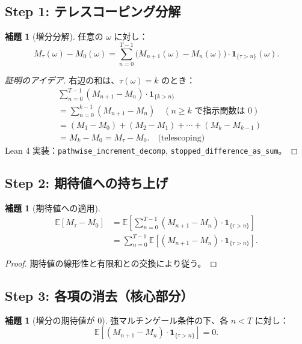 \documentclass[a4paper,12pt]{ltjsarticle}
\theoremstyle{definition}
\newtheorem{lemma}[definition]{補題}
\begin{document}
\subsection{Step 1: テレスコーピング分解}

\begin{lemma}[増分分解]
任意の $\omega$ に対し：
\[
  M_\tau(\omega) - M_0(\omega) =
  \sum_{n=0}^{T-1} \bigl(M_{n+1}(\omega) - M_n(\omega)\bigr) \cdot \mathbf{1}_{\{\tau > n\}}(\omega).
\]
\end{lemma}

\begin{proof}[証明のアイデア]
右辺の和は、$\tau(\omega) = k$ のとき：
\begin{align*}
  &\sum_{n=0}^{T-1} (M_{n+1} - M_n) \cdot \mathbf{1}_{\{k > n\}} \\
  &= \sum_{n=0}^{k-1} (M_{n+1} - M_n) \quad (\text{$n \geq k$ で指示関数は 0})\\
  &= (M_1 - M_0) + (M_2 - M_1) + \cdots + (M_k - M_{k-1}) \\
  &= M_k - M_0 = M_\tau - M_0. \quad \text{(telescoping)}
\end{align*}
Lean 4 実装：\texttt{pathwise\_increment\_decomp}, \texttt{stopped\_difference\_as\_sum}。
\end{proof}

\subsection{Step 2: 期待値への持ち上げ}

\begin{lemma}[期待値への適用]
\begin{align*}
  \mathbb{E}[M_\tau - M_0]
  &= \mathbb{E}\left[\sum_{n=0}^{T-1} (M_{n+1} - M_n) \cdot \mathbf{1}_{\{\tau > n\}}\right] \\
  &= \sum_{n=0}^{T-1} \mathbb{E}[(M_{n+1} - M_n) \cdot \mathbf{1}_{\{\tau > n\}}].
\end{align*}
\end{lemma}

\begin{proof}
期待値の線形性と有限和との交換により従う。
\end{proof}

\subsection{Step 3: 各項の消去（核心部分）}

\begin{lemma}[増分の期待値が 0]
強マルチンゲール条件の下、各 $n < T$ に対し：
\[
  \mathbb{E}[(M_{n+1} - M_n) \cdot \mathbf{1}_{\{\tau > n\}}] = 0.
\]
\end{lemma}
\end{document}
